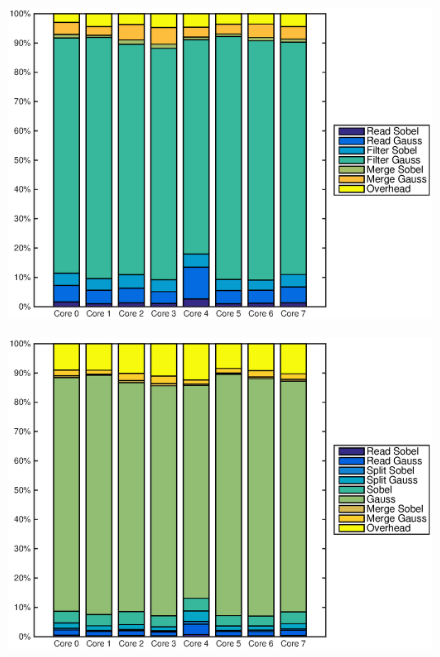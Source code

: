 \begin{figure}
    \centering
    \begin{minipage}{0.45\textwidth}
        \centering
        \includegraphics[width=0.99\linewidth]{images/openem_sobelcif_gauss4cif_eo.eps}
    \end{minipage}
    \hfill
    \begin{minipage}{0.45\textwidth}
        \centering
        \includegraphics[width=0.99\linewidth]{images/openem_sobelcif_gauss4cif_func.eps}
        \label{fig:oem8corefuncgauss4cif}
    \end{minipage}%
\end{figure}
